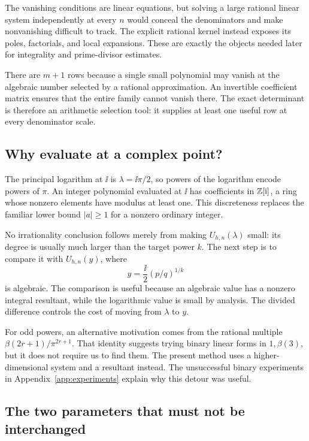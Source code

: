 The vanishing conditions are linear equations, but solving a large
rational linear system independently at every \(n\) would conceal
the denominators and make nonvanishing difficult to track. The
explicit rational kernel instead exposes its poles, factorials,
and local expansions. These are exactly the objects needed later
for integrality and prime-divisor estimates.

There are \(m+1\) rows because a single small polynomial may vanish
at the algebraic number selected by a rational approximation.
An invertible coefficient matrix ensures that the entire family
cannot vanish there. The exact determinant is therefore an
arithmetic selection tool: it supplies at least one useful row at
every denominator scale.

\subsection{Why evaluate at a complex point?}

The principal logarithm at \(\ii\) is
\(\lambda=\ii\pi/2\), so powers of the logarithm encode powers of
\(\pi\). An integer polynomial evaluated at \(\ii\) has coefficients
in \(\mathbb Z[\mathrm{i}]\), a ring whose nonzero elements have modulus at
least one. This discreteness replaces the familiar lower bound
\(|a|\ge1\) for a nonzero ordinary integer.

No irrationality conclusion follows merely from making
\(U_{h,n}(\lambda)\) small: its degree is usually much larger than
the target power \(k\). The next step is to compare it with
\(U_{h,n}(y)\), where
\[
y=\frac{\ii}{2}(p/q)^{1/k}
\]
is algebraic. The comparison is useful because an algebraic value
has a nonzero integral resultant, while the logarithmic value is
small by analysis. The divided difference controls the cost of
moving from \(\lambda\) to \(y\).

For odd powers, an alternative motivation comes from the rational
multiple \(\beta(2r+1)/\pi^{2r+1}\). That identity suggests trying
binary linear forms in \(1,\beta(3)\), but it does not require us
to find them. The present method uses a higher-dimensional system
and a resultant instead. The unsuccessful binary experiments in
Appendix~\ref{app:experiments} explain why this detour was useful.

\subsection{The two parameters that must not be interchanged}

